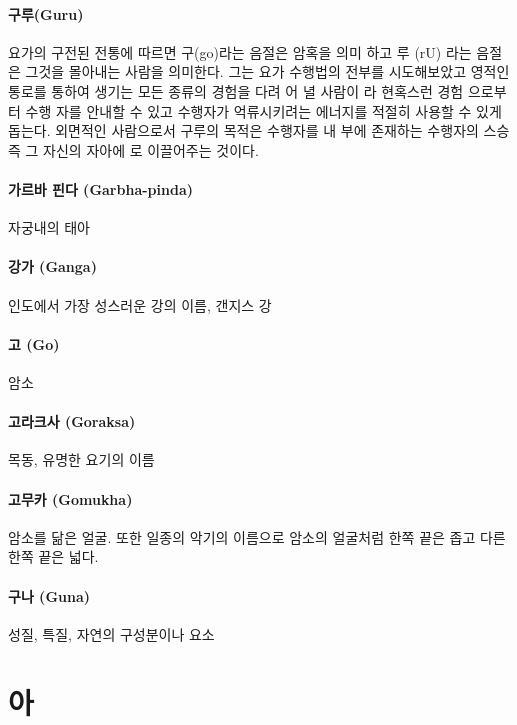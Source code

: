 \documentclass[12pt, a4paper, oneside]{book}
\let\stdsection\section
\renewcommand\section{\newpage\stdsection}
\begin{document}
\paragraph{구루(Guru)}
요가의 구전된 전통에 따르면 구(go)라는 음절은 암혹을 의미 하고 루 (rU) 라는 음절은 그것을 몰아내는 사람을 의미한다. 그는 요가 수행법의 전부를 시도해보았고 영적인 통로를 통하여 생기는 모든 종류의 경험을 다려 어 녈 사람이 라 현혹스런 경험 으로부터 수행 자를 안내할 수 있고 수행자가 억류시키려는 에너지를 적절히 사용할 수 있게 돕는다. 외면적인 사람으로서 구루의 목적은 수행자를 내 부에 존재하는 수행자의 스승 즉 그 자신의 자아에 로 이끌어주는 것이다.

\paragraph{가르바 핀다 (Garbha-pinda)}
자궁내의 태아

\paragraph{강가 (Ganga)}
인도에서 가장 성스러운 강의 이름, 갠지스 강

\paragraph{고 (Go)}
암소

\paragraph{고라크사 (Goraksa)}
목동, 유명한 요기의 이름

\paragraph{고무카 (Gomukha)}
암소를 닮은 얼굴. 또한 일종의 악기의 이름으로 암소의 얼굴처럼 한쪽 끝은 좁고 다른 한쪽 끝은 넓다.

\paragraph{구나 (Guna)}
성질, 특질, 자연의 구성분이나 요소





\newpage
\section{아 }
\end{document}
